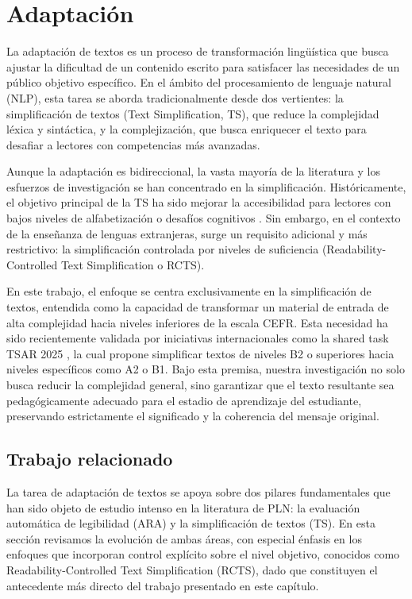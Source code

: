 
\section{Adaptación}\label{sec:adaptacion}
La adaptación de textos es un proceso de transformación lingüística que busca ajustar la dificultad de un contenido escrito para satisfacer las necesidades de un público objetivo específico. En el ámbito del procesamiento de lenguaje natural (NLP), esta tarea se aborda tradicionalmente desde dos vertientes: la simplificación de textos (Text Simplification, TS), que reduce la complejidad léxica y sintáctica, y la complejización, que busca enriquecer el texto para desafiar a lectores con competencias más avanzadas.

Aunque la adaptación es bidireccional, la vasta mayoría de la literatura y los esfuerzos de investigación se han concentrado en la simplificación. Históricamente, el objetivo principal de la TS ha sido mejorar la accesibilidad para lectores con bajos niveles de alfabetización o desafíos cognitivos \parencite{Siddharthan2014}. Sin embargo, en el contexto de la enseñanza de lenguas extranjeras, surge un requisito adicional y más restrictivo: la simplificación controlada por niveles de suficiencia (Readability-Controlled Text Simplification o RCTS).

En este trabajo, el enfoque se centra exclusivamente en la simplificación de textos, entendida como la capacidad de transformar un material de entrada de alta complejidad hacia niveles inferiores de la escala CEFR. Esta necesidad ha sido recientemente validada por iniciativas internacionales como la shared task TSAR 2025 \parencite{alva-manchego-etal-2025-findings}, la cual propone simplificar textos de niveles B2 o superiores hacia niveles específicos como A2 o B1. Bajo esta premisa, nuestra investigación no solo busca reducir la complejidad general, sino garantizar que el texto resultante sea pedagógicamente adecuado para el estadio de aprendizaje del estudiante, preservando estrictamente el significado y la coherencia del mensaje original.

\subsection{Trabajo relacionado}\label{subsection:ad_trabajo}
La tarea de adaptación de textos se apoya sobre dos pilares fundamentales que han sido objeto de estudio intenso en la literatura de PLN: la evaluación automática de legibilidad (ARA) y la simplificación de textos (TS). En esta sección revisamos la evolución de ambas áreas, con especial énfasis en los enfoques que incorporan control explícito sobre el nivel objetivo, conocidos como Readability-Controlled Text Simplification (RCTS), dado que constituyen el antecedente más directo del trabajo presentado en este capítulo.
